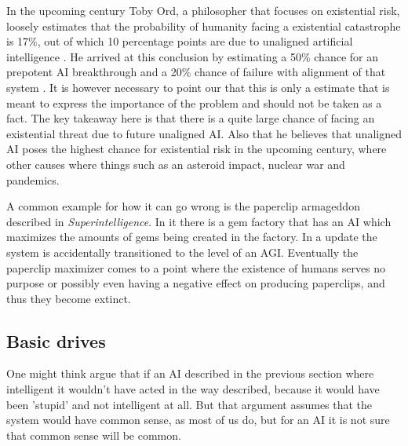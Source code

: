\documentclass[12pt,A4]{report}
\theoremstyle{definition}
\begin{document}
In the upcoming century Toby Ord, a philosopher that focuses on existential risk, loosely estimates that the probability of humanity facing a existential catastrophe is 17\%, out of which 10 percentage points are due to unaligned artificial intelligence \autocite{precipice}. He arrived at this conclusion by estimating a 50\% chance for an prepotent AI breakthrough and a 20\% chance of failure with alignment of that system \autocite{rationally speaking}. It is however necessary to point our that this is only a estimate that is meant to express the importance of the problem and should not be taken as a fact. The key takeaway here is that there is a quite large chance of facing an existential threat due to future unaligned AI. Also that he believes that unaligned AI poses the highest chance for existential risk in the upcoming century, where other causes where things such as an asteroid impact, nuclear war and pandemics. 

A common example for how it can go wrong is the paperclip armageddon described in \textit{Superintelligence}. In it there is a gem factory that has an AI which maximizes the amounts of gems being created in the factory. In a update the system is accidentally transitioned to the level of an AGI. Eventually the paperclip maximizer comes to a point where the existence of humans serves no purpose or possibly even having a negative effect on producing paperclips, and thus they become extinct. 

\subsection{Basic drives}
One might think argue that if an AI described in the previous section where intelligent it wouldn't have acted in the way described, because it would have been 'stupid' and not intelligent at all. But that argument assumes that the system would have common sense, as most of us do, but for an AI it is not sure that common sense will be common. 
\end{document}
